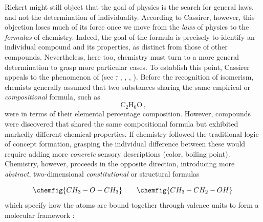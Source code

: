 \documentclass[submitted,12pt]{article}
\providecommand{\DIFdel}[1]{{\protect\color{red}\sout{#1}}}                      %
\providecommand{\DIFdelbegin}{} %
\providecommand{\DIFdelend}{} %
\begin{document}
Rickert might still object that the goal of physics is the search for general laws, and not the determination of individuality. According to Cassirer, however, this objection loses much of its force once we move from the \emph{laws} of physics to the \emph{formulas} of chemistry. Indeed, the goal of the formula is precisely to identify an individual compound and its properties, as distinct from those of other compounds. Nevertheless, here too, chemistry must turn to a more general determination to grasp more particular cases. To establish this point, Cassirer appeals to the phenomenon of  (see \DIFdelbegin \DIFdel{, }\DIFdelend \cite[122--24, 274--78]{Ladenburg1902}, \cite[chap.~VII]{Duhem1902}, \cite[II.III]{Wurtz1879}, \cite[lect.~IV]{Ostwald1906Leitlinien}). Before the recognition of isomerism, chemists generally assumed that two substances sharing the same empirical or \emph{compositional} formula, such as
%
\begin{equation*}
\mathrm{C}_2 \mathrm{H}_6 \mathrm{O}\,,
\end{equation*}
%
were  in terms of their elemental percentage composition. However, compounds were discovered that shared the same compositional formula but exhibited markedly different chemical properties. If chemistry followed the traditional logic of concept formation, grasping the individual difference between these  would require adding more \emph{concrete} sensory descriptions (color, boiling point\etc). Chemistry, however, proceeds in the opposite direction, introducing more \emph{abstract}, two-dimensional \emph{constitutional} or structural formulas 

\begin{equation*}
\chemfig{CH_3-O-CH_3} \quad \quad \chemfig{CH_3-CH_2-OH}\,
\end{equation*}
%
which specify how the atoms are bound together through valence units to form a molecular framework :
\end{document}
